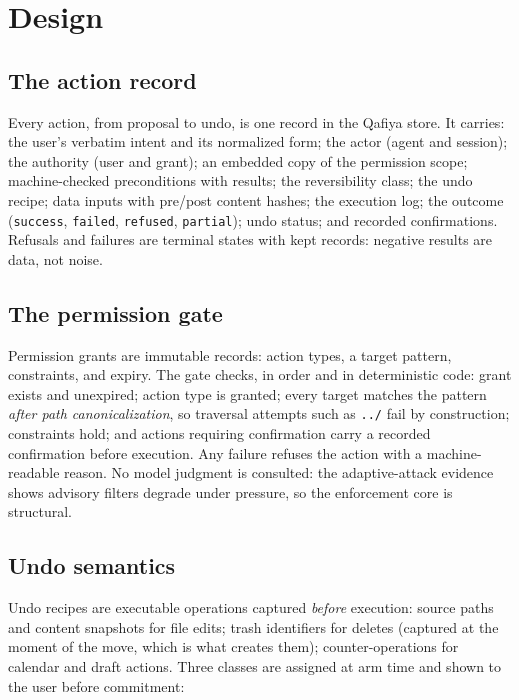 \documentclass[11pt]{article}
\begin{document}
\section{Design}

\subsection{The action record}

Every action, from proposal to undo, is one record in the Qafiya store. It
carries: the user's verbatim intent and its normalized form; the actor (agent and
session); the authority (user and grant); an embedded copy of the permission
scope; machine-checked preconditions with results; the reversibility class; the
undo recipe; data inputs with pre/post content hashes; the execution log; the
outcome (\texttt{success}, \texttt{failed}, \texttt{refused},
\texttt{partial}); undo status; and recorded confirmations. Refusals and failures
are terminal states with kept records: negative results are data, not noise.

\subsection{The permission gate}

Permission grants are immutable records: action types, a target pattern,
constraints, and expiry. The gate checks, in order and in deterministic code:
grant exists and unexpired; action type is granted; every target matches the
pattern \emph{after path canonicalization}, so traversal attempts such as
\texttt{../} fail by construction; constraints hold; and actions requiring
confirmation carry a recorded confirmation before execution. Any failure refuses
the action with a machine-readable reason. No model judgment is consulted: the
adaptive-attack evidence shows advisory filters degrade under pressure, so the
enforcement core is structural.

\subsection{Undo semantics}

Undo recipes are executable operations captured \emph{before} execution: source
paths and content snapshots for file edits; trash identifiers for deletes (captured
at the moment of the move, which is what creates them); counter-operations for
calendar and draft actions. Three classes are assigned at
arm time and shown to the user before commitment:
\end{document}
